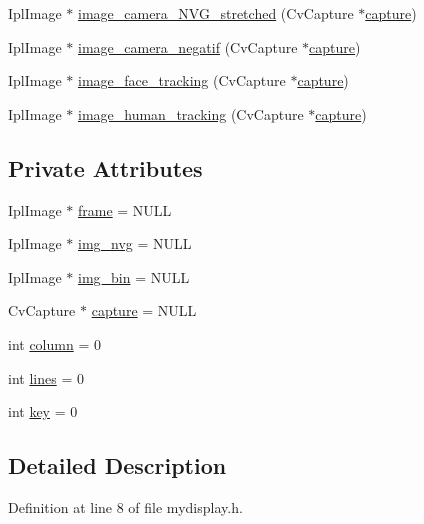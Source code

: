 \begin{DoxyCompactItemize}
Ipl\-Image $\ast$ \hyperlink{classMyDisplay_a661a4a4884d246002faf8044e0975312}{image\-\_\-camera\-\_\-\-N\-V\-G\-\_\-stretched} (Cv\-Capture $\ast$\hyperlink{classMyDisplay_aa2d469497bae80c2dc6596542a6af041}{capture})
\item 
Ipl\-Image $\ast$ \hyperlink{classMyDisplay_a19fca82a8e9441c154a3d1ed4fbc261a}{image\-\_\-camera\-\_\-negatif} (Cv\-Capture $\ast$\hyperlink{classMyDisplay_aa2d469497bae80c2dc6596542a6af041}{capture})
\item 
Ipl\-Image $\ast$ \hyperlink{classMyDisplay_ad1c456244088d6282726143224c112e0}{image\-\_\-face\-\_\-tracking} (Cv\-Capture $\ast$\hyperlink{classMyDisplay_aa2d469497bae80c2dc6596542a6af041}{capture})
\item 
Ipl\-Image $\ast$ \hyperlink{classMyDisplay_ae08642f4d5698ff0d25b9e03765db55b}{image\-\_\-human\-\_\-tracking} (Cv\-Capture $\ast$\hyperlink{classMyDisplay_aa2d469497bae80c2dc6596542a6af041}{capture})
\end{DoxyCompactItemize}
\subsection*{Private Attributes}
\begin{DoxyCompactItemize}
\item 
Ipl\-Image $\ast$ \hyperlink{classMyDisplay_aee26cb4ae47e963a1491466d08a27d0c}{frame} = N\-U\-L\-L
\item 
Ipl\-Image $\ast$ \hyperlink{classMyDisplay_a66ed19ac74896c2fef063f853a80416f}{img\-\_\-nvg} = N\-U\-L\-L
\item 
Ipl\-Image $\ast$ \hyperlink{classMyDisplay_aaa25208b5bfada51a5ac878f76453f44}{img\-\_\-bin} = N\-U\-L\-L
\item 
Cv\-Capture $\ast$ \hyperlink{classMyDisplay_aa2d469497bae80c2dc6596542a6af041}{capture} = N\-U\-L\-L
\item 
int \hyperlink{classMyDisplay_a94a51f56cd8e8c5b6e22f5634b5d5f12}{column} = 0
\item 
int \hyperlink{classMyDisplay_a2cb48c4b915895b0bc7e7cd0f524a3be}{lines} = 0
\item 
int \hyperlink{classMyDisplay_af7602dfb0020925158d89532de80135e}{key} = 0
\end{DoxyCompactItemize}


\subsection{Detailed Description}


Definition at line 8 of file mydisplay.\-h.



